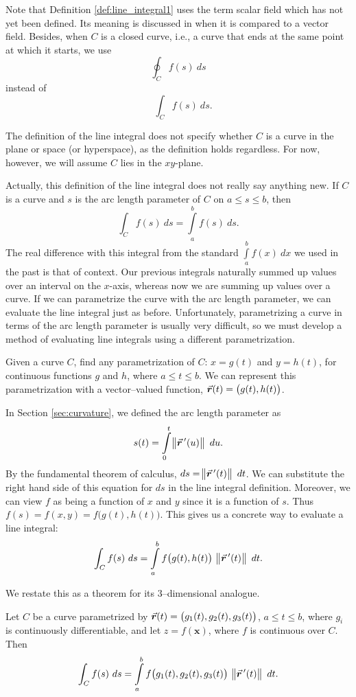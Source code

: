 Note that Definition \ref{def:line_integral1} uses the term scalar field which has not yet been defined. Its meaning is discussed in  when it is compared to a vector field. Besides, when $C$ is a closed curve, i.e., a curve that ends at the same point at which it starts,  we use 
$$
\oint_C f(s)\ ds$$
instead of
$$
\quad \int_C f(s)\ ds.$$

The definition of the line integral does not specify whether $C$ is a curve in the plane or space (or hyperspace), as the definition holds regardless. For now, however, we will assume $C$ lies in the $xy$-plane.

Actually, this definition of the line integral  does not really say anything new. If $C$ is a curve and $s$ is the arc length parameter of $C$ on $a\leq s\leq b$, then 
$$\int_Cf(s)\ ds = \int\limits_a^bf(s)\ ds.$$
The real difference with this integral from the standard $\int\limits_a^bf(x)\ dx$ we used in the past is that of context. Our previous integrals naturally summed up values over an interval on the $x$-axis, whereas now we are summing up values over a curve. If we can parametrize the curve with the arc length parameter, we can evaluate the line integral just as before. Unfortunately, parametrizing a curve in terms of the arc length parameter is usually very difficult, so we must develop a method of evaluating line integrals using a different parametrization.

Given a curve $C$, find any parametrization of $C$: $x = g(t)$ and $y=h(t)$, for continuous functions $g$ and $h$, where $a\leq t\leq b$. We can represent this parametrization with a vector--valued function, \linebreak $\vrt = \left( g(t),h(t)\right)$.

In Section \ref{sec:curvature}, we defined the arc length parameter as 
$$
s(t) = \int\limits_0^t \norm{\vec r\,'(u)}\ du. 
$$
By the fundamental theorem of calculus, $ds = \norm{\vec r\,'(t)}\ dt$. We can substitute the right hand side of this equation for $ds$ in the line integral definition. Moreover, we can view $f$ as being a function of $x$ and $y$ since it is a function of $s$. Thus $f(s) =f(x,y) =f\big(g(t),h(t)\big)$. This gives us a concrete way to evaluate a line integral:
$$\int_C f(s)\ ds = \int\limits_a^bf\big(g(t),h(t)\big)\ \norm{\vec r\,'(t)}\ dt.$$

We restate this as a theorem for its $3$--dimensional analogue.


\begin{theorem}\label{thm:line1}
Let $C$ be a curve parametrized by $\vrt =\left( g_1(t), g_2(t),g_3(t)\right)$, $a\leq t\leq b$, where $g_i$ is continuously differentiable, and let $z=f(\mathbf{x})$, where $f$ is continuous over $C$. Then%
	$$\int_Cf(s)\ ds = \int\limits_a^bf\big(g_1(t),g_2(t),g_3(t)\big)\ \norm{\vec r\,'(t)}\ dt.$$
\end{theorem}


